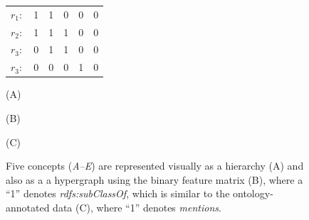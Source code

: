 \begin{figure}[tbh]
\begin{minipage}[c]{.25\textwidth}
\begin{tabular}{ c | c | c | c | c | c |}
    \cline{2-6}
    $r_1:$& 1 & 1 & 0 & 0 & 0 \\
    \cline{2-6}
    $r_2:$& 1 & 1 & 1 & 0 & 0 \\
    \cline{2-6}
    $r_3:$& 0 & 1 & 1 & 0 & 0 \\
    \cline{2-6}
    $r_3:$& 0 & 0 & 0 & 1 & 0 \\
    \cline{2-6}
    \end{tabular}
\end{minipage}
\begin{minipage}[c]{0.4\linewidth}\centering
(A)
\end{minipage}
\begin{minipage}[c]{0.25\linewidth}\centering
(B)
\end{minipage}
\begin{minipage}[c]{0.25\linewidth}\centering
(C)
\end{minipage}
\caption{\label{fig:onto-and-data} Five concepts (\emph{A--E}) are represented visually as a hierarchy (A) and also as a a hypergraph using the binary feature matrix (B), where a ``1'' denotes \emph{rdfs:subClassOf}, which is similar to the ontology-annotated data (C), where ``1'' denotes \emph{mentions}.}
\end{figure}

